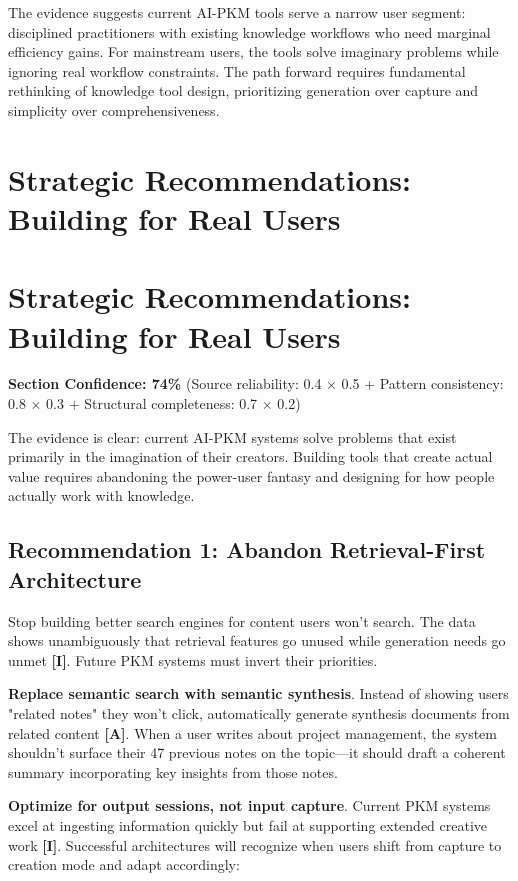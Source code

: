 \documentclass[a4paper,11pt]{article}
\newcommand{\ilabel}{\textbf{\textcolor{icolor}{[I]}}}
\newcommand{\alabel}{\textbf{\textcolor{acolor}{[A]}}}
\begin{document}
The evidence suggests current AI-PKM tools serve a narrow user segment: disciplined practitioners with existing knowledge workflows who need marginal efficiency gains. For mainstream users, the tools solve imaginary problems while ignoring real workflow constraints. The path forward requires fundamental rethinking of knowledge tool design, prioritizing generation over capture and simplicity over comprehensiveness.

\clearpage
\section{Strategic Recommendations: Building for Real Users}

\section{Strategic Recommendations: Building for Real Users}

\textbf{Section Confidence: 74\%} (Source reliability: 0.4 × 0.5 + Pattern consistency: 0.8 × 0.3 + Structural completeness: 0.7 × 0.2)


The evidence is clear: current AI-PKM systems solve problems that exist primarily in the imagination of their creators. Building tools that create actual value requires abandoning the power-user fantasy and designing for how people actually work with knowledge.


\subsection{Recommendation 1: Abandon Retrieval-First Architecture}

Stop building better search engines for content users won't search. The data shows unambiguously that retrieval features go unused while generation needs go unmet \ilabel{}. Future PKM systems must invert their priorities.


\textbf{Replace semantic search with semantic synthesis}. Instead of showing users "related notes" they won't click, automatically generate synthesis documents from related content \alabel{}. When a user writes about project management, the system shouldn't surface their 47 previous notes on the topic—it should draft a coherent summary incorporating key insights from those notes.


\textbf{Optimize for output sessions, not input capture}. Current PKM systems excel at ingesting information quickly but fail at supporting extended creative work \ilabel{}. Successful architectures will recognize when users shift from capture to creation mode and adapt accordingly:
\end{document}
